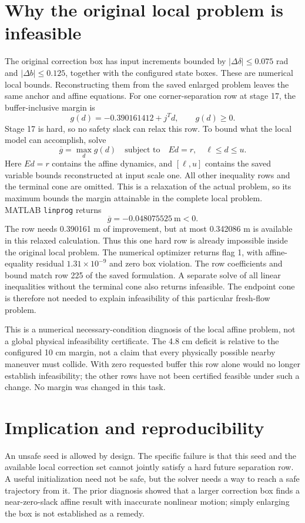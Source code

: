 \documentclass[11pt]{article}
\begin{document}
\section{Why the original local problem is infeasible}
The original correction box has input increments bounded by
$|\Delta\delta|\le0.075$ rad and $|\Delta b|\le0.125$, together with the
configured state boxes. These are numerical local bounds. Reconstructing them
from the saved enlarged problem leaves the same anchor and affine equations.
For one corner-separation row at stage 17, the buffer-inclusive margin is
\[
 g(d)=-0.390161412+j^Td,\qquad g(d)\ge0.
\]
Stage 17 is hard, so no safety slack can relax this row. To bound what the
local model can accomplish, solve
\[
 \overline g=\max_d g(d)\quad\text{subject to}\quad
 Ed=r,\quad \ell\le d\le u.
\]
Here $Ed=r$ contains the affine dynamics, and $[\ell,u]$ contains the saved
variable bounds reconstructed at input scale one. All other inequality rows
and the terminal cone are omitted. This is a relaxation of the actual problem,
so its maximum bounds the margin attainable in the complete local problem.
MATLAB \texttt{linprog} returns
\[
 \overline g=-0.048075525\ \mathrm{m}<0.
\]
The row needs 0.390161 m of improvement, but at most 0.342086 m is available
in this relaxed calculation. Thus this one hard row is already impossible
inside the original local problem. The numerical optimizer returns flag 1,
with affine-equality residual $1.31\times10^{-9}$ and zero box violation.
The row coefficients and bound match row 225 of the saved formulation.
A separate solve of all linear inequalities without the terminal cone also
returns infeasible. The endpoint cone is therefore not needed to explain
infeasibility of this particular fresh-flow problem.

This is a numerical necessary-condition diagnosis of the local affine problem,
not a global physical infeasibility certificate. The 4.8 cm deficit is relative
to the configured 10 cm margin, not a claim that every physically possible
nearby maneuver must collide. With zero requested buffer this row alone would
no longer establish infeasibility; the other rows have not been certified
feasible under such a change. No margin was changed in this task.

\section{Implication and reproducibility}
An unsafe seed is allowed by design. The specific failure is that this seed
and the available local correction set cannot jointly satisfy a hard future
separation row. A useful initialization need not be safe, but the solver needs
a way to reach a safe trajectory from it. The prior diagnosis showed that a
larger correction box finds a near-zero-slack affine result with inaccurate
nonlinear motion; simply enlarging the box is not established as a remedy.
\end{document}
